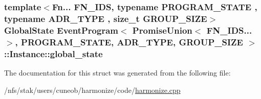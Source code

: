 \hypertarget{structEventProgram_3_01PromiseUnion_3_01FN__IDS_8_8_8_4_00	PROGRAM__STATE_00	ADR__TYPE_00	GROUP__SIZE_01_4_1_1Instance_a8fcc46c017816768787913561b8513a9}{
\subsubsection[{global\-\_\-state}]{\setlength{\rightskip}{0pt plus 5cm}template$<$Fn... F\-N\-\_\-\-I\-D\-S, typename P\-R\-O\-G\-R\-A\-M\-\_\-\-S\-T\-A\-T\-E , typename A\-D\-R\-\_\-\-T\-Y\-P\-E , size\-\_\-t G\-R\-O\-U\-P\-\_\-\-S\-I\-Z\-E$>$ {\bf Global\-State} {\bf Event\-Program}$<$ {\bf Promise\-Union}$<$ F\-N\-\_\-\-I\-D\-S...$>$,	P\-R\-O\-G\-R\-A\-M\-\_\-\-S\-T\-A\-T\-E,	A\-D\-R\-\_\-\-T\-Y\-P\-E,	G\-R\-O\-U\-P\-\_\-\-S\-I\-Z\-E $>$\-::Instance\-::global\-\_\-state}}\label{structEventProgram_3_01PromiseUnion_3_01FN__IDS_8_8_8_4_00	PROGRAM__STATE_00	ADR__TYPE_00	GROUP__SIZE_01_4_1_1Instance_a8fcc46c017816768787913561b8513a9}


The documentation for this struct was generated from the following file\-:\begin{DoxyCompactItemize}
\item 
/nfs/stak/users/cuneob/harmonize/code/\hyperlink{harmonize_8cpp}{harmonize.\-cpp}\end{DoxyCompactItemize}
